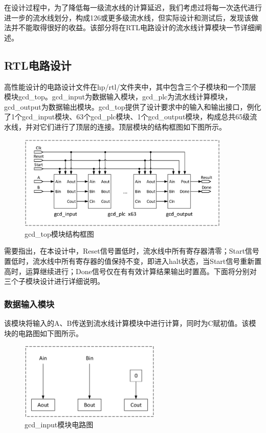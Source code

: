 \documentclass[12pt]{article}
\begin{document}
在设计过程中，为了降低每一级流水线的计算延迟，我们考虑过将每一次迭代进行进一步的流水线划分，构成126或更多级流水线，但实际设计和测试后，发现该做法并不能取得很好的收益。该部分将在RTL电路设计的流水线计算模块一节详细阐述。

\subsection{RTL电路设计}
高性能设计的电路设计文件在hp/rtl/文件夹中，其中包含三个子模块和一个顶层模块gcd\_top。gcd\_input为数据输入模块，gcd\_plc为流水线计算模块，gcd\_output为数据输出模块。gcd\_top提供了设计要求中的输入和输出接口，例化了1个gcd\_input模块、63个gcd\_plc模块、1个gcd\_output模块，构成总共65级流水线，并对它们进行了顶层的连接。顶层模块的结构框图如下图所示。

\begin{figure}[H]
\begin{center}
\includegraphics[width=0.9\textwidth]{./yhc_hp/gcd_top.eps}
\caption{gcd\_top模块结构框图}
\end{center}
\end{figure}

需要指出，在本设计中，Reset信号置低时，流水线中所有寄存器清零；Start信号置低时，流水线中所有寄存器的值保持不变，即进入halt状态，当Start信号重新置高时，运算继续进行；Done信号仅在有有效计算结果输出时置高。下面将分别对三个子模块设计进行详细说明。

\subsubsection{数据输入模块}
该模块将输入的A、B传送到流水线计算模块中进行计算，同时为C赋初值。该模块的电路图如下图所示。

\begin{figure}[H]
\begin{center}
\includegraphics[width=0.6\textwidth]{./yhc_hp/gcd_input.eps}
\caption{gcd\_input模块电路图}
\end{center}
\end{figure}
\end{document}
